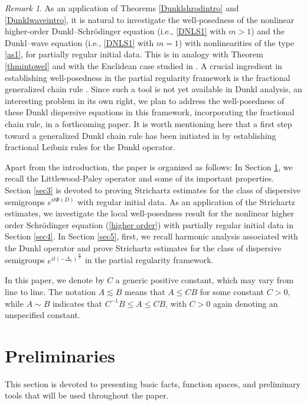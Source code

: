 \documentclass[a4paper,11pt, reqno]{amsart}
\theoremstyle{definition}
\theoremstyle{remark}
\newtheorem{rem}[theorem]{Remark}
\numberwithin{equation}{section}
\begin{document}
    

    \begin{rem} 
As an application of Theorems \ref{Dunklshrodintro} and \ref{Dunklwaveintro}, it is natural to investigate the well-posedness of the nonlinear higher-order Dunkl–Schrödinger equation (i.e., \eqref{DNLS1} with $m>1$) and the Dunkl–wave equation (i.e., \eqref{DNLS1} with $m=1$) with nonlinearities of the type \eqref{as1}, for partially regular initial data. This is in analogy with Theorem \ref{thmintowel} and with the Euclidean case studied in \cite{KLS23}. A crucial ingredient in establishing well-posedness in the partial regularity framework is the fractional generalized chain rule \cite{CW91, KLS23}. Since such a tool is not yet available in Dunkl analysis, an interesting problem in its own right, we plan to address the well-posedness of these Dunkl dispersive equations in this framework, incorporating the fractional chain rule, in a forthcoming paper. It is worth mentioning here that a first step toward a generalized Dunkl chain rule has been initiated in \cite{BM25} by establishing fractional Leibniz rules for the Dunkl operator.
 \end{rem}
	
	Apart from the introduction, the paper is organized as follows: In Section \ref{sec2}, we recall the Littlewood-Paley operator and some of its important properties. Section \ref{sec3} is devoted to proving Strichartz estimates for the class of dispersive semigroups $e^{it\Phi(D)}$ with regular initial data. As an application of the Strichartz estimates, we investigate the local well-posedness result for the nonlinear higher order Schr\"odinger equation (\ref{higher order}) with partially regular initial data in Section \ref{sec4}. In Section \ref{sec5}, first, we recall harmonic analysis associated with the Dunkl operator and prove  Strichartz estimates for the class of dispersive semigroups $e^{it(-\Delta_\kappa)^{\frac{m}{2}}}$ in the partial regularity framework. 
	
    In this paper, we denote by \( C \) a generic positive constant, which may vary from line to line. The notation \( A \lesssim B \) means that \( A \leq C B \) for some constant \( C > 0 \), while \( A \sim B \) indicates that \( C^{-1} B \leq A \leq C B \), with \( C > 0 \) again denoting an unspecified constant.


    
    \section{Preliminaries}\label{sec2}
    This section is devoted to presenting basic facts, function spaces, and preliminary tools that will be used throughout the paper.
\end{document}
